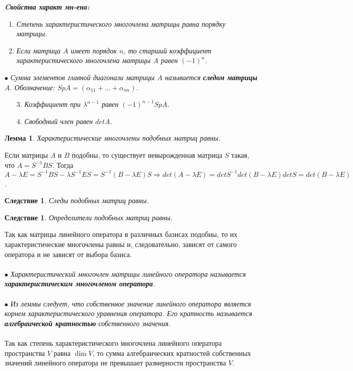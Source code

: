 \textbf{\textit{Cвойства характ мн-ена:}}\begin{enumerate}
	\item \textit{Степень характеристического многочлена матрицы равна порядку матрицы.}
	\item \textit{Если матрица $A$ имеет порядок $n$, то старший коэффициент характеристического многочлена матрицы $A$ равен $(-1)^n$.}
\end{enumerate}
$\bullet$ \textit{Сумма элементов главной диагонали матрицы $A$ называется \textbf{следом матрицы} $A$. Обозначение: $SpA = (\alpha_{11} + \ldots + \alpha_{nn})$}.
\begin{enumerate}
	\item[3.] \textit{Коэффициент при $\lambda^{n-1}$ равен $(-1)^{n-1}SpA$.}
	\item[4.] \textit{Свободный член равен $detA$.}
\end{enumerate}
\newtheorem*{lem11_8_1}{Лемма}\begin{lem11_8_1}Характеристические многочлены подобных матриц равны.
\end{lem11_8_1}\begin{Proof}
	Если матрицы $A$ и $B$ подобны, то существует невырожденная матрица $S$ такая, что $A = S^{-1}BS$. Тогда $A-\lambda E = S^{-1}BS - \lambda S^{-1}ES = S^{-1}(B-\lambda E) S \Rightarrow det(A-\lambda E) = det S^{-1} det(B-\lambda E) det S = det(B-\lambda E)$.
\end{Proof}
\newtheorem*{cor11_8_1}{Следствие}\begin{cor11_8_1}Следы подобных матриц равны.
\end{cor11_8_1}
\newtheorem*{cor11_8_2}{Следствие}\begin{cor11_8_2}Определители подобных матриц равны.
\end{cor11_8_2}
Так как матрицы линейного оператора в различных базисах подобны, то их характеристические многочлены равны и, следовательно, зависят от самого оператора и не зависят от выбора базиса.\\\\
$\bullet$ \textit{Характеристический многочлен матрицы линейного оператора называется \textbf{характеристическим многочленом оператора}.}\\\\
$\bullet$ \textit{Из леммы следует, что собственное значение линейного оператора является корнем характеристического уравнения оператора. Его кратность называется \textbf{алгебраической кратностью} собственного значения.}\\\\
Так как степень характеристического многочлена линейного оператора пространства $V$ равна $\dim V$, то сумма алгебраических кратностей собственных значений линейного оператора не превышает размерности пространства $V$.






